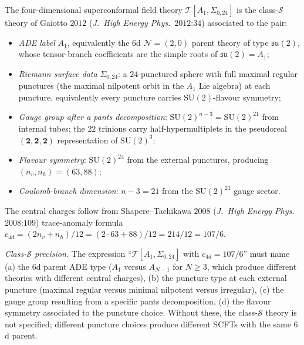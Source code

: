 \begin{theorem}
\label{wn:thm:third-pass-class-S-gauge-flavour}

The four-dimensional superconformal field theory
$\mathcal{T}[A_1, \Sigma_{0, 24}]$ is the class-$\mathcal{S}$ theory
of Gaiotto $2012$ (\emph{J.~High Energy Phys.}~$2012$:$34$)
associated to the pair:
\begin{itemize}
\item \emph{ADE label} $A_1$, equivalently the
$6$d $\mathcal{N} = (2, 0)$ parent theory of type $\mathfrak{su}(2)$,
whose tensor-branch coefficients are the simple roots of
$\mathfrak{su}(2) = A_1$;
\item \emph{Riemann surface data} $\Sigma_{0, 24}$: a
$24$-punctured sphere with full maximal regular punctures (the maximal
nilpotent orbit in the $A_1$ Lie algebra) at each puncture, equivalently
every puncture carries $\mathrm{SU}(2)$-flavour symmetry;
\item \emph{Gauge group after a pants decomposition}:
$\mathrm{SU}(2)^{n - 3} = \mathrm{SU}(2)^{21}$ from internal tubes;
the $22$ trinions carry half-hypermultiplets in the pseudoreal
$(\mathbf{2}, \mathbf{2}, \mathbf{2})$ representation of
$\mathrm{SU}(2)^3$;
\item \emph{Flavour symmetry}: $\mathrm{SU}(2)^{24}$ from the external
punctures, producing $(n_v, n_h) = (63, 88)$;
\item \emph{Coulomb-branch dimension}: $n - 3 = 21$ from the
$\mathrm{SU}(2)^{21}$ gauge sector.
\end{itemize}
The central charges follow from Shapere--Tachikawa $2008$
(\emph{J.~High Energy Phys.}~$2008$:$109$) trace-anomaly formula
$c_{4d} = (2n_v + n_h)/12 = (2 \cdot 63 + 88)/12 = 214/12 = 107/6$.

\emph{Class-$\mathcal{S}$ precision.} The expression
``$\mathcal{T}[A_1, \Sigma_{0, 24}]$ with $c_{4d} = 107/6$'' must name
(a) the $6$d parent ADE type ($A_1$ versus $A_{N - 1}$ for
$N \geq 3$, which produce different theories with different central
charges), (b) the puncture type at each external puncture (maximal
regular versus minimal nilpotent versus irregular), (c) the gauge
group resulting from a specific pants decomposition, (d) the flavour
symmetry associated to the puncture choice. Without these, the
class-$\mathcal{S}$ theory is not specified; different puncture
choices produce different SCFTs with the same $6$d parent.


\end{theorem}
